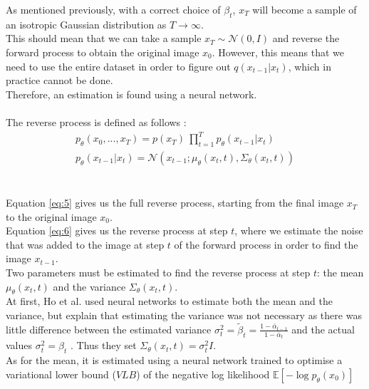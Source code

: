 \documentclass{article}
\begin{document}
As mentioned previously, with a correct choice of $\beta_t$, $x_T$ will become a sample of an isotropic Gaussian distribution as $T \rightarrow \infty$. \cite{nichol2021improved, sohldickstein2015deep} \\
This should mean that we can take a sample $x_T \sim \mathcal{N}\left(0, I\right)$ and reverse the forward process to obtain the original image $x_0$. 
However, this means that we need to use the entire dataset in order to figure out $q\left(x_{t-1} | x_t\right)$, which in practice cannot be done. \cite{nichol2021improved} \\
Therefore, an estimation is found using a neural network. \cite{nichol2021improved}
\\\\
The reverse process is defined as follows \cite{ho2020denoising}:
\begin{gather}
  p_{\theta}\left(x_0, ..., x_T\right) = p\left(x_T\right) \: \prod_{t=1}^T p_{\theta}\left(x_{t-1} | x_t\right) \label{eq:5} \\
  p_{\theta}\left(x_{t-1} | x_t\right) = \mathcal{N}\left(x_{t-1}; \mu_{\theta}\left(x_t, t\right), \Sigma_{\theta}\left(x_t, t\right)\right) \label{eq:6}
\end{gather}
\\\\
Equation \ref{eq:5} gives us the full reverse process, starting from the final image $x_T$ to the original image $x_0$. \\
Equation \ref{eq:6} gives us the reverse process at step $t$, where we estimate the noise that was added to the image at step $t$ of the forward process in order to find the image $x_{t-1}$. \\
Two parameters must be estimated to find the reverse process at step $t$: the mean $\mu_{\theta}\left(x_t, t\right)$ and the variance $\Sigma_{\theta}\left(x_t, t\right)$. \\
At first, Ho et al. \cite{ho2020denoising} used neural networks to estimate both the mean and the variance, but explain that estimating the variance was not necessary as there was little difference between the estimated variance $\sigma_t^2 = \tilde{\beta}_t = \frac{1 - \bar{\alpha}_{t-1}}{1 - \bar{\alpha}_t}$ and the actual values $\sigma_t^2 = \beta_t$ \cite{ho2020denoising}. Thus they set $\Sigma_{\theta}\left(x_t, t\right) = \sigma_t^2 I$. \\
As for the mean, it is estimated using a neural network trained to optimise a variational lower bound ($VLB$) of the negative log likelihood $\mathbb{E}\left[- \log p_{\theta} \left(x_0\right)\right]$ \cite{ho2020denoising}
\end{document}
